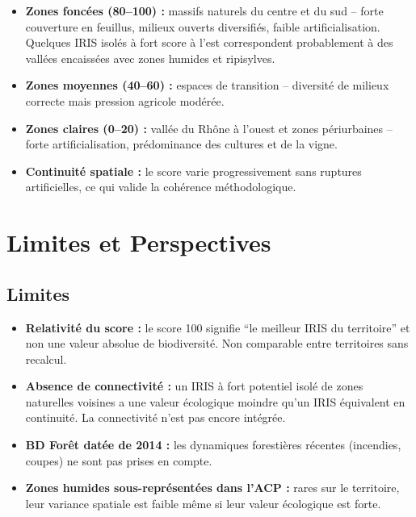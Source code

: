 \documentclass[12pt,a4paper]{report}
\begin{document}
\begin{itemize}[leftmargin=1.5cm]
  \item \textbf{Zones foncées (80--100) :} massifs naturels du centre et du sud -- forte couverture en feuillus, milieux ouverts diversifiés, faible artificialisation. Quelques IRIS isolés à fort score à l'est correspondent probablement à des vallées encaissées avec zones humides et ripisylves.
  \item \textbf{Zones moyennes (40--60) :} espaces de transition -- diversité de milieux correcte mais pression agricole modérée.
  \item \textbf{Zones claires (0--20) :} vallée du Rhône à l'ouest et zones périurbaines -- forte artificialisation, prédominance des cultures et de la vigne.
  \item \textbf{Continuité spatiale :} le score varie progressivement sans ruptures artificielles, ce qui valide la cohérence méthodologique.
\end{itemize}

\section{Limites et Perspectives}

\subsection{Limites}

\begin{itemize}[leftmargin=1.5cm]
  \item \textbf{Relativité du score :} le score 100 signifie ``le meilleur IRIS du territoire'' et non une valeur absolue de biodiversité. Non comparable entre territoires sans recalcul.
  \item \textbf{Absence de connectivité :} un IRIS à fort potentiel isolé de zones naturelles voisines a une valeur écologique moindre qu'un IRIS équivalent en continuité. La connectivité n'est pas encore intégrée.
  \item \textbf{BD Forêt datée de 2014 :} les dynamiques forestières récentes (incendies, coupes) ne sont pas prises en compte.
  \item \textbf{Zones humides sous-représentées dans l'ACP :} rares sur le territoire, leur variance spatiale est faible même si leur valeur écologique est forte.
\end{itemize}
\end{document}
